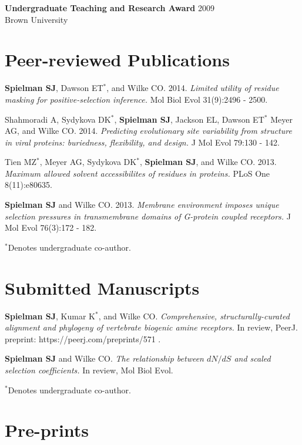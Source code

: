 \documentclass[line, margin]{res}
\begin{document}
\begin{resume}
\textbf{Undergraduate Teaching and Research Award} \hfill 2009 \\ Brown University



\vspace{0.75cm}

\section{Peer-reviewed Publications}

\textbf{Spielman SJ}, Dawson ET$^\ast$, and Wilke CO. 2014. \emph{Limited utility of residue masking for positive-selection inference.} Mol Biol Evol 31(9):2496 - 2500.

Shahmoradi A, Sydykova DK$^\ast$, \textbf{Spielman SJ}, Jackson EL, Dawson ET$^\ast$ Meyer AG, and Wilke CO. 2014. \emph{Predicting evolutionary site variability from structure in viral proteins: buriedness, flexibility, and design.} J Mol Evol 79:130 - 142.

Tien MZ$^\ast$, Meyer AG, Sydykova DK$^\ast$, \textbf{Spielman SJ}, and Wilke CO. 2013. \emph{Maximum allowed solvent accessibilites of residues in proteins.} PLoS One 8(11):e80635.


\textbf{Spielman SJ} and Wilke CO. 2013. \emph{Membrane environment imposes unique selection pressures in transmembrane domains of G-protein coupled receptors.} J Mol Evol 76(3):172 - 182.


$^\ast$Denotes undergraduate co-author.

\vspace{0.75cm}


\section{Submitted Manuscripts}

\textbf{Spielman SJ}, Kumar K$^\ast$, and Wilke CO. \emph{Comprehensive, structurally-curated alignment and phylogeny of vertebrate biogenic amine receptors.} In review, PeerJ. preprint: https://peerj.com/preprints/571 .


\textbf{Spielman SJ} and Wilke CO. \emph{The relationship between $dN/dS$ and scaled selection coefficients.}  In review, Mol Biol Evol.

 
$^\ast$Denotes undergraduate co-author.

\vspace{0.75cm}

\section{Pre-prints}


\end{resume}
\end{document}
